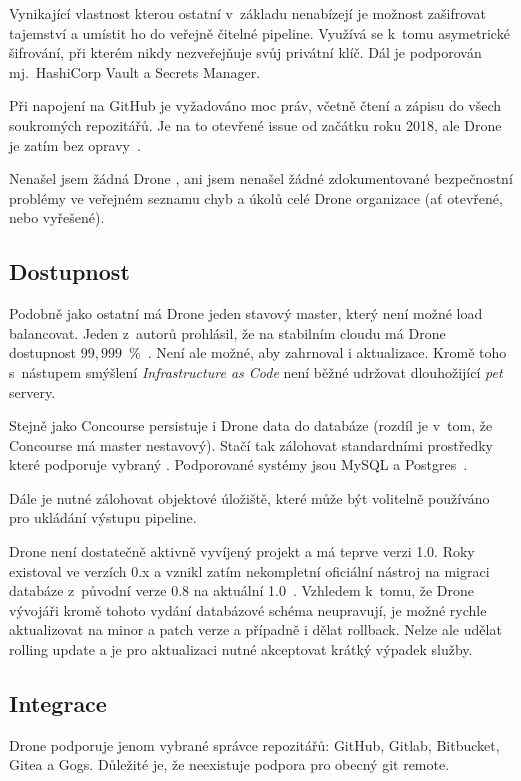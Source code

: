         Vynikající vlastnost kterou ostatní v~základu \CI nenabízejí je možnost zašifrovat tajemství a umístit ho do veřejně čitelné pipeline. Využívá se k~tomu asymetrické šifrování, při kterém \CI nikdy nezveřejňuje svůj privátní klíč. Dál je podporován mj.~HashiCorp Vault a  Secrets Manager.

        Při napojení na GitHub je vyžadováno moc práv, včetně čtení a zápisu do všech soukromých repozitářů. Je na to otevřené issue od začátku roku 2018, ale Drone je zatím bez opravy~\cite{drone-github-acl}.

        Nenašel jsem žádná Drone , ani jsem nenašel žádné zdokumentované bezpečnostní problémy ve veřejném seznamu chyb a úkolů celé Drone organizace (ať otevřené, nebo vyřešené).

    \subsection{Dostupnost}
        Podobně jako ostatní \CI má Drone jeden stavový master, který není možné load balancovat. Jeden z~autorů prohlásil, že na stabilním cloudu má Drone dostupnost $99,999$~\%~\cite{drone-ha}. Není ale možné, aby zahrnoval i aktualizace. Kromě toho s~nástupem smýšlení \textit{Infrastructure as Code} není běžné udržovat dlouhožijící \textit{pet} servery.

        Stejně jako Concourse persistuje i Drone data do databáze (rozdíl je v~tom, že Concourse má master nestavový). Stačí tak zálohovat standardními prostředky které podporuje vybraný . Podporované systémy jsou MySQL a Postgres~\cite{drone-database}.

        Dále je nutné zálohovat objektové úložiště, které může být volitelně používáno pro ukládání výstupu pipeline.

        Drone není dostatečně aktivně vyvíjený projekt a má teprve verzi 1.0. Roky existoval ve verzích 0.x a vznikl zatím nekompletní oficiální nástroj na migraci databáze z~původní verze 0.8 na aktuální 1.0~\cite{drone-mig}. Vzhledem k~tomu, že Drone vývojáři kromě tohoto vydání databázové schéma neupravují, je možné rychle aktualizovat na minor a patch verze a případně i dělat rollback. Nelze ale udělat rolling update a je pro aktualizaci nutné akceptovat krátký výpadek služby.

    \subsection{Integrace}
        Drone podporuje jenom vybrané správce repozitářů: GitHub, Gitlab, Bitbucket, Gitea a Gogs. Důležité je, že neexistuje podpora pro obecný git remote.


